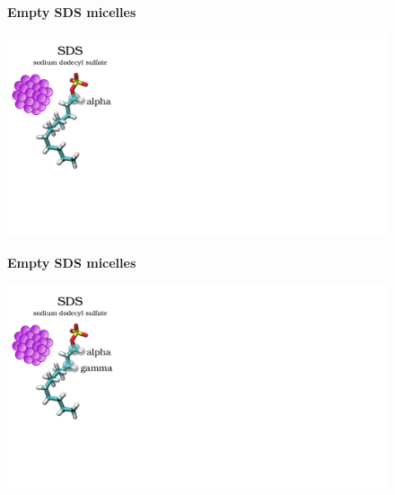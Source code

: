 \documentclass{beamer}
\begin{document}
\addtocounter{framenumber}{-1}
\begin{frame}
\begin{center}
\Large{\centering

\textbf{Empty SDS micelles} \\}

\vspace{0.5cm}


\includegraphics[height=6cm]{sds9.pdf}
\end{center}
\end{frame}



\addtocounter{framenumber}{-1}
\begin{frame}
\begin{center}
\Large{\centering

\textbf{Empty SDS micelles} \\}

\vspace{0.5cm}


\includegraphics[height=6cm]{sds8.pdf}
\end{center}
\end{frame}
\end{document}

